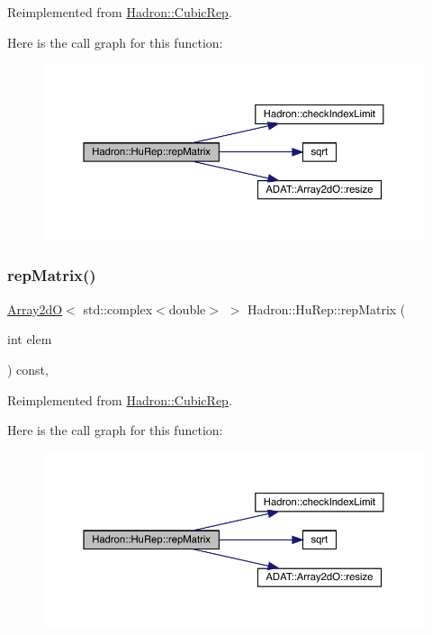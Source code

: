 Reimplemented from \mbox{\hyperlink{structHadron_1_1CubicRep_ac5d7e9e6f4ab1158b5fce3e4ad9e8005}{Hadron\+::\+Cubic\+Rep}}.

Here is the call graph for this function\+:
\nopagebreak
\begin{figure}[H]
\begin{center}
\leavevmode
\includegraphics[width=350pt]{d9/dd4/structHadron_1_1HuRep_a744a3604c724067d8912075d0d8acf59_cgraph}
\end{center}
\end{figure}
\mbox{\label{structHadron_1_1HuRep_a744a3604c724067d8912075d0d8acf59}} 
\subsubsection{\texorpdfstring{repMatrix()}{repMatrix()}\hspace{0.1cm}{\footnotesize\ttfamily [2/2]}}
{\footnotesize\ttfamily \mbox{\hyperlink{classADAT_1_1Array2dO}{Array2dO}}$<$ std\+::complex$<$double$>$ $>$ Hadron\+::\+Hu\+Rep\+::rep\+Matrix (\begin{DoxyParamCaption}\item[{int}]{elem }\end{DoxyParamCaption}) const\hspace{0.3cm}{\ttfamily [inline]}, {\ttfamily [virtual]}}



Reimplemented from \mbox{\hyperlink{structHadron_1_1CubicRep_ac5d7e9e6f4ab1158b5fce3e4ad9e8005}{Hadron\+::\+Cubic\+Rep}}.

Here is the call graph for this function\+:
\nopagebreak
\begin{figure}[H]
\begin{center}
\leavevmode
\includegraphics[width=350pt]{d9/dd4/structHadron_1_1HuRep_a744a3604c724067d8912075d0d8acf59_cgraph}
\end{center}
\end{figure}


